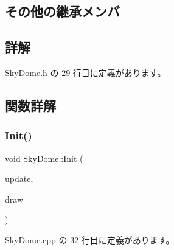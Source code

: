 \subsection*{その他の継承メンバ}


\subsection{詳解}


 Sky\+Dome.\+h の 29 行目に定義があります。



\subsection{関数詳解}
\mbox{\label{class_sky_dome_a948e0e90cea46c78053ac55610812d6c}} 
\subsubsection{\texorpdfstring{Init()}{Init()}}
{\footnotesize\ttfamily void Sky\+Dome\+::\+Init (\begin{DoxyParamCaption}\item[{\mbox{\hyperlink{class_update_base}{Update\+Base}} $\ast$}]{update,  }\item[{\mbox{\hyperlink{class_draw_base}{Draw\+Base}} $\ast$}]{draw }\end{DoxyParamCaption})}



 Sky\+Dome.\+cpp の 32 行目に定義があります。

